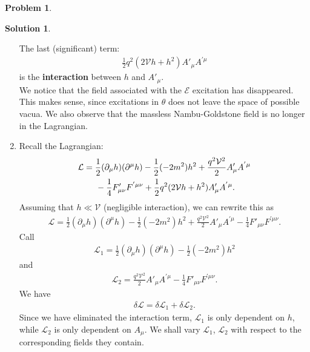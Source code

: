 \documentclass[a4paper,11pt]{article}
\numberwithin{equation}{section}
\theoremstyle{definition}
\newtheorem{prob}{Problem}[section]
\newtheorem{sln}{Solution}[section]
\newcommand{\p}{\partial}
\newcommand{\lag}{\mathcal{L}}
\newcommand{\E}{\mathcal{E}}
\newcommand{\V}{\mathcal{V}}
\begin{document}
\begin{prob}
\begin{sln}
\begin{enumerate}
				The last (significant) term:
				\begin{align}
				\boxed{\frac{1}{2}q^2(2\V h + h^2)A'_\mu A^{'\mu}}
				\end{align}
				is the \textbf{interaction} between $h$ and $A'_\mu$.\\
				
				We notice that the field associated with the $\E$ excitation has disappeared. This makes sense, since excitations in $\theta$ does not leave the space of possible vacua. We also observe that the massless Nambu-Goldstone field is no longer in the Lagrangian.\\
				
				
				
				
				
				
				
				
				
				\item Recall the Lagrangian:
				\begin{align}
				\lag &= \frac{1}{2}(\p_\mu h)(\p^\mu h) - \frac{1}{2}(-2m^2)h^2 + \frac{q^2\V^2}{2}A'_\mu A^{'\mu}\nonumber\\ 
				&\hspace{0.5cm} - \frac{1}{4}F'_{\mu\nu}F^{'\mu\nu} + \frac{1}{2}q^2(2\V h + h^2)A'_\mu A^{'\mu}.
				\end{align}
				Assuming that $h \ll \V$ (negligible interaction), we can rewrite this as
				\begin{align}
				\lag = \frac{1}{2}(\p_\mu h)(\p^\mu h) - \frac{1}{2}(-2m^2)h^2 + \frac{q^2\V^2}{2}A'_\mu A^{'\mu} - \frac{1}{4}F'_{\mu\nu}F^{'\mu\nu}.
				\end{align}
				Call
				\begin{align}
				\lag_1 = \frac{1}{2}(\p_\mu h)(\p^\mu h) - \frac{1}{2}(-2m^2)h^2  
				\end{align}
				and 
				\begin{align}
				\lag_2 = \frac{q^2\V^2}{2}A'_\mu A^{'\mu} - \frac{1}{4}F'_{\mu\nu}F^{'\mu\nu}.
				\end{align}
				We have
				\begin{align}
				\delta \lag = \delta \lag_1 + \delta \lag_2.
				\end{align}
				Since we have eliminated the interaction term, $\lag_1$ is only dependent on $h$, while $\lag_2$ is only dependent on $A_\mu$. We shall vary $\lag_1$, $\lag_2$ with respect to the corresponding fields they contain.\\
				

\end{enumerate}
\end{sln}
\end{prob}
\end{document}
